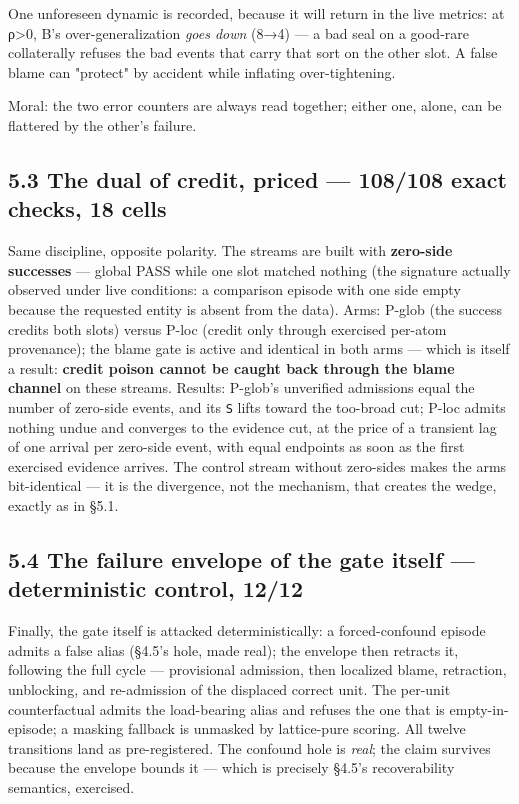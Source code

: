 \documentclass[11pt]{article}
\begin{document}
One unforeseen dynamic is recorded, because it will return in the live metrics: at ρ>0, B's over-generalization \emph{goes down} (8→4) — a bad seal on a good-rare collaterally refuses the bad events that carry that sort on the other slot. A false blame can "protect" by accident while inflating over-tightening.

Moral: the two error counters are always read together; either one, alone, can be flattered by the other's failure.

\subsection*{5.3 The dual of credit, priced — 108/108 exact checks, 18 cells}

Same discipline, opposite polarity. The streams are built with \textbf{zero-side successes} — global PASS while one slot matched nothing (the signature actually observed under live conditions: a comparison episode with one side empty because the requested entity is absent from the data). Arms: P-glob (the success credits both slots) versus P-loc (credit only through exercised per-atom provenance); the blame gate is active and identical in both arms — which is itself a result: \textbf{credit poison cannot be caught back through the blame channel} on these streams. Results: P-glob's unverified admissions equal the number of zero-side events, and its \texttt{S} lifts toward the too-broad cut; P-loc admits nothing undue and converges to the evidence cut, at the price of a transient lag of one arrival per zero-side event, with equal endpoints as soon as the first exercised evidence arrives. The control stream without zero-sides makes the arms bit-identical — it is the divergence, not the mechanism, that creates the wedge, exactly as in §5.1.

\subsection*{5.4 The failure envelope of the gate itself — deterministic control, 12/12}

Finally, the gate itself is attacked deterministically: a forced-confound episode admits a false alias (§4.5's hole, made real); the envelope then retracts it, following the full cycle — provisional admission, then localized blame, retraction, unblocking, and re-admission of the displaced correct unit. The per-unit counterfactual admits the load-bearing alias and refuses the one that is empty-in-episode; a masking fallback is unmasked by lattice-pure scoring. All twelve transitions land as pre-registered. The confound hole is \emph{real}; the claim survives because the envelope bounds it — which is precisely §4.5's recoverability semantics, exercised.
\end{document}
